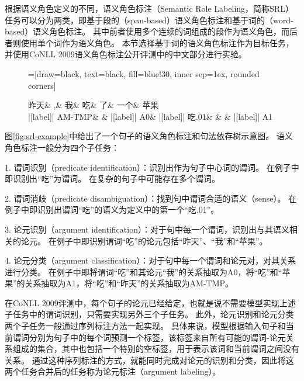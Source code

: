 根据语义角色定义的不同，语义角色标注（Semantic Role Labeling，简称SRL）任务可以分为两类，即基于段的（span-based）语义角色标注和基于词的（word-based）语义角色标注。
其中前者使用多个连续的词组成的段作为语义角色，而后者则使用单个词作为语义角色。
本节选择基于词的语义角色标注作为目标任务，并使用CoNLL 2009\cite{hajic-etal-2009-conll}语义角色标注公开评测中的中文部分进行实验。

\begin{figure}[htbp]
	\centering
	\begin{dependency}[arc edge, arc angle=80, text only label, label style={above}]
	    =[draw=black, text=black, fill=blue!30, inner sep=1ex, rounded corners]
		\begin{deptext}[column sep=1.5em, row sep=.5ex]
		    昨天\&      ,\& 我\& 吃\&  了\& 一个\& 苹果\\
		    |[label]| AM-TMP\&     \& |[label]| A0\& |[label]| 吃.01\& \&   \& |[label]| A1\\
		\end{deptext}
	\end{dependency}
\end{figure}

图\ref{fig:srl-example}中给出了一个句子的语义角色标注和句法依存树示意图。
语义角色标注一般分为四个子任务：

1. 谓词识别（predicate identification）：识别出作为句子中心词的谓词。
在例子中即识别出“吃”为谓词。
在复杂的句子中可能存在多个谓词。

2. 谓词消歧（predicate disambiguation）：找到句中谓词合适的语义（sense）。
在例子中即识别出谓词“吃”的语义为定义中的第一个“吃.01”。

3. 论元识别（argument identification）：对于句中每一个谓词，识别出与其语义相关的论元。
在例子中即识别谓词“吃”的论元包括“昨天”、“我”和“苹果”。

4. 论元分类（argument classification）：对于句中每一个谓词和论元对，对其关系进行分类。
在例子中即将谓词“吃”和其论元“我”的关系抽取为A0，将“吃”和“苹果”的关系抽取为A1，将“吃”和“昨天”的关系抽取为AM-TMP。

在CoNLL 2009评测中，每个句子的论元已经给定，也就是说不需要模型实现上述子任务中的谓词识别，只需要实现另外三个子任务。
此外，论元识别和论元分类两个子任务一般通过序列标注方法一起实现。
具体来说，模型根据输入句子和当前谓词分别为句子中的每个词预测一个标签，该标签来自所有可能的谓词-论元关系组成的集合，其中也包括一个特别的空标签，用于表示该词和当前谓词之间没有关系。
通过这种序列标注的方式，就能同时完成对论元的识别和分类，因此将这两个任务合并后的任务称为论元标注（argument labeling）。

